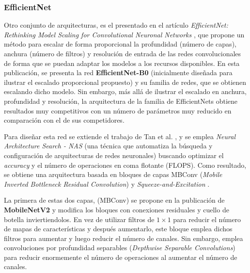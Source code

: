 

\subsubsection{EfficientNet}
Otro conjunto de arquitecturas, es el presentado en el artículo \textit{EfficientNet: Rethinking Model Scaling for Convolutional Neuronal Networks} \cite{efficientnet}, que propone un método para escalar de forma proporcional la profundidad (número de capas), anchura (número de filtros) y resolución de entrada de las redes convolucionales de forma que se puedan adaptar los modelos a los recursos disponibles. En esta publicación, se presenta la red \textbf{EfficientNet-B0} (inicialmente diseñada para ilustrar el escalado proporcional propuesto) y su familia de redes, que se obtienen escalando dicho modelo. Sin embargo, más allá de ilustrar el escalado en anchura, profundidad y resolución, la arquitectura de la familia de EfficientNets obtiene resultados muy competitivos con un número de parámetros muy reducido en comparación con el de sus competidores.

Para diseñar esta red se extiende el trabajo de Tan et al. \cite{mnasnet}, y se emplea \textit{Neural Architecture Search - NAS} (una técnica que automatiza la búsqueda y configuración de arquitecturas de redes neuronales) buscando optimizar el \textit{accuracy}  y el número de operaciones en coma flotante (FLOPS). Como resultado, se obtiene una arquitectura basada en bloques de capas MBConv (\textit{Mobile Inverted Bottleneck Residual Convolution}) \cite{mobilenetv2} y \textit{Squeeze-and-Excitation} \cite{senet}.

La primera de estas dos capas, (MBConv) se propone en la publicación de \textbf{MobileNetV2} \cite{mobilenetv2} y modifica los bloques con conexiones residuales y cuello de botella inviertiendolos. En vez de utilizar filtros de $1\times1$ para reducir el número de mapas de características y después aumentarlo, este bloque emplea dichos filtros para aumentar y luego reducir el número de canales. Sin embargo, emplea convoluciones por profundidad separables (\textit{Depthwise Separable Convolutions}) para reducir enormemente el número de operaciones al aumentar el número de canales. 

